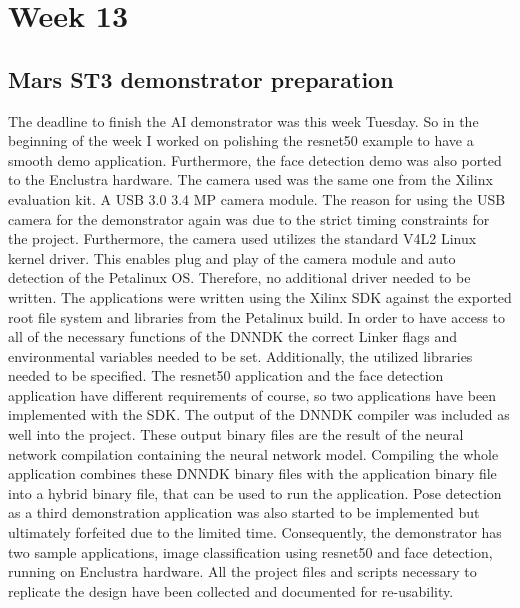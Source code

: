 \section{Week 13}
\subsection{Mars ST3 demonstrator preparation}
The deadline to finish the \ac{AI} demonstrator was this week Tuesday. So in the beginning of the week I worked on polishing the resnet50 example to have a smooth demo application. Furthermore, the face detection demo was also ported to the Enclustra hardware. The camera used was the same one from the Xilinx evaluation kit. A \ac{USB} 3.0 3.4 MP camera module. The reason for using the \ac{USB} camera for the demonstrator again was due to the strict timing constraints for the project. Furthermore, the camera used utilizes the standard V4L2 Linux kernel driver. This enables plug and play of the camera module and auto detection of the Petalinux \ac{OS}. Therefore, no additional driver needed to be written. The applications were written using the Xilinx \ac{SDK} against the exported root file system and libraries from the Petalinux build. In order to have access to all of the necessary functions of the \ac{DNNDK} the correct Linker flags and environmental variables needed to be set. Additionally, the utilized libraries needed to be specified. The resnet50 application and the face detection application have different requirements of course, so two applications have been implemented with the \ac{SDK}. The output of the \ac{DNNDK} compiler was included as well into the project. These output binary files are the result of the neural network compilation containing the neural network model. Compiling the whole application combines these \ac{DNNDK} binary files with the application binary file into a hybrid binary file, that can be used to run the application. Pose detection as a third demonstration application was also started to be implemented but ultimately forfeited due to the limited time. Consequently, the demonstrator has two sample applications, image classification using resnet50 and face detection, running on Enclustra hardware. All the project files and scripts necessary to replicate the design have been collected and documented for re-usability.
